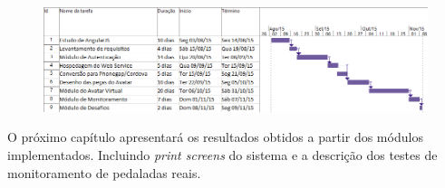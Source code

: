 \begin{figure}[h]
\begin{minipage}{1.0\textwidth}
    \centerline{\includegraphics[width=35em]{figuras/ganttDesenv.png}}
    \label{fig:gantt}
\end{minipage}
\end{figure}

%

O próximo capítulo apresentará os resultados obtidos a partir dos módulos implementados. Incluindo \textit{print screens} do sistema e a descrição dos testes de monitoramento de pedaladas reais.